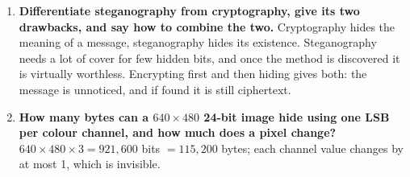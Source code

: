 \begin{enumerate}[leftmargin=1.6em,itemsep=3pt]
  \item \textbf{Differentiate steganography from cryptography, give its two drawbacks, and say how to combine the two.} Cryptography hides the meaning of a message, steganography hides its existence. Steganography needs a lot of cover for few hidden bits, and once the method is discovered it is virtually worthless. Encrypting first and then hiding gives both: the message is unnoticed, and if found it is still ciphertext.
  \item \textbf{How many bytes can a $640 \times 480$ 24-bit image hide using one LSB per colour channel, and how much does a pixel change?} $640 \times 480 \times 3 = 921{,}600$ bits $= 115{,}200$ bytes; each channel value changes by at most 1, which is invisible.
\end{enumerate}
